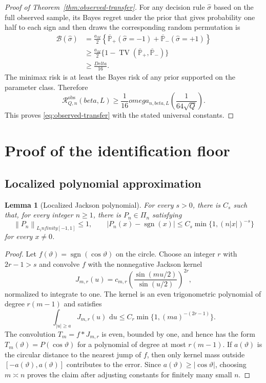\documentclass[11pt]{article}
\def\beta{beta}%
\def\omega{omega}%
\def\infty{infinity}%
\def\Delta{Delta}%
\newtheorem{lemma}[theorem]{Lemma}
\newcommand{\sgn}{\operatorname{sgn}}
\newcommand{\TV}{\operatorname{TV}}
\newcommand{\calR}{\mathcal R}
\newcommand{\norm}[1]{\left\lVert#1\right\rVert}
\newcommand{\dd}{\,\mathrm d}
\begin{document}
\begin{proof}[Proof of Theorem~\ref{thm:observed-transfer}]
For any decision rule $\widehat\sigma$ based on the full observed sample, its Bayes regret under the prior that gives probability one half to each sign and then draws the corresponding random permutation is
\begin{align*}
\mathcal B(\widehat\sigma)
&=
\frac{a_M}{2}
\left\{
\overline{\mathbb P}_+(\widehat\sigma=-1)
+
\overline{\mathbb P}_-(\widehat\sigma=+1)
\right\}\\
&\ge
\frac{a_M}{2}
\{1-\TV(\overline{\mathbb P}_+,\overline{\mathbb P}_-)\}\\
&\ge
\frac{\Delta}{16}.
\end{align*}
The minimax risk is at least the Bayes risk of any prior supported on the parameter class.  Therefore
\[
\calR^{\mathrm{obs}}_{Q,n}(\beta,L)
\ge
\frac1{16}\omega_{n,\beta,L}\!\left(\frac{1}{64\sqrt Q}\right).
\]
This proves \eqref{eq:observed-transfer} with the stated universal constants.
\end{proof}


\section{Proof of the identification floor}
\label{app:identification}

\subsection{Localized polynomial approximation}

\begin{lemma}[Localized Jackson polynomial]
\label{lem:jackson}
For every $s>0$, there is $C_s$ such that, for every integer $n\ge1$, there is $P_n\in\Pi_n$ satisfying
\[
\norm{P_n}_{L_\infty[-1,1]}\le1,
\qquad
|P_n(x)-\sgn(x)|
\le
C_s\min\{1,(n|x|)^{-s}\}
\]
for every $x\ne0$.
\end{lemma}

\begin{proof}
Let $f(\vartheta)=\sgn(\cos\vartheta)$ on the circle.  Choose an integer $r$ with $2r-1>s$ and convolve $f$ with the nonnegative Jackson kernel
\[
J_{m,r}(u)
=c_{m,r}
\left(\frac{\sin(mu/2)}{\sin(u/2)}\right)^{2r},
\]
normalized to integrate to one.  The kernel is an even trigonometric polynomial of degree $r(m-1)$ and satisfies
\[
\int_{|u|\ge a}J_{m,r}(u)\,\dd u
\le
C_r\min\{1,(ma)^{-(2r-1)}\}.
\]
The convolution $T_m=f*J_{m,r}$ is even, bounded by one, and hence has the form $T_m(\vartheta)=P(\cos\vartheta)$ for a polynomial of degree at most $r(m-1)$.  If $a(\vartheta)$ is the circular distance to the nearest jump of $f$, then only kernel mass outside $[-a(\vartheta),a(\vartheta)]$ contributes to the error.  Since $a(\vartheta)\ge|\cos\vartheta|$, choosing $m\asymp n$ proves the claim after adjusting constants for finitely many small $n$.
\end{proof}
\end{document}
